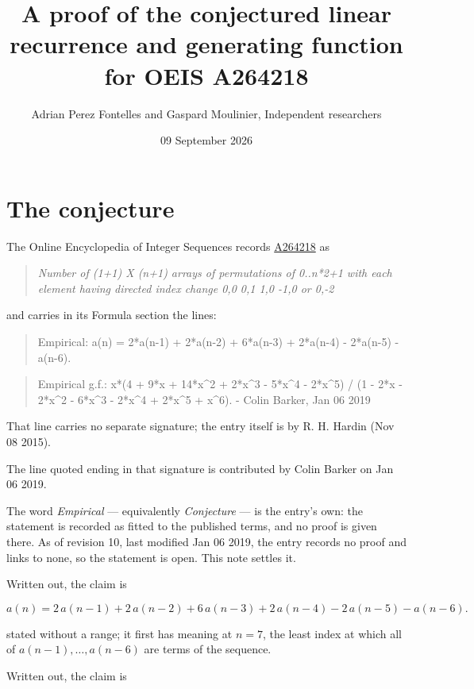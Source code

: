 \documentclass[11pt]{article}
\title{A proof of the conjectured linear recurrence and generating function for OEIS A264218}
\author{Adrian Perez Fontelles and Gaspard Moulinier, Independent researchers}
\date{09 September 2026}
\theoremstyle{definition}
\begin{document}
\maketitle
\section{The conjecture}

The Online Encyclopedia of Integer Sequences records \href{https://oeis.org/A264218}{A264218} as

\begin{quote}\itshape Number of (1+1) X (n+1) arrays of permutations of 0..n*2+1 with each element having directed index change 0,0 0,1 1,0 -1,0 or 0,-2\end{quote}

and carries in its Formula section the lines:

\begin{quote}\ttfamily Empirical: a(n) = 2*a(n-1) + 2*a(n-2) + 6*a(n-3) + 2*a(n-4) - 2*a(n-5) - a(n-6).\end{quote}

\begin{quote}\ttfamily Empirical g.f.: x*(4 + 9*x + 14*x\textasciicircum{}2 + 2*x\textasciicircum{}3 - 5*x\textasciicircum{}4 - 2*x\textasciicircum{}5) / (1 - 2*x - 2*x\textasciicircum{}2 - 6*x\textasciicircum{}3 - 2*x\textasciicircum{}4 + 2*x\textasciicircum{}5 + x\textasciicircum{}6). - Colin Barker, Jan 06 2019\end{quote}

That line carries no separate signature; the entry itself is by R. H. Hardin (Nov 08 2015).

The line quoted ending in that signature is contributed by Colin Barker on Jan 06 2019.

The word {\itshape Empirical} --- equivalently {\itshape Conjecture} --- is the entry's own: the statement is recorded as fitted to the published terms, and no proof is given there. As of revision 10, last modified Jan 06 2019, the entry records no proof and links to none, so the statement is open. This note settles it.

Written out, the claim is

\[a(n) = 2\,a(n-1) + 2\,a(n-2) + 6\,a(n-3) + 2\,a(n-4) - 2\,a(n-5) - a(n-6).\]

stated without a range; it first has meaning at $n = 7$, the least index at which all of $a(n-1),\dots,a(n-6)$ are terms of the sequence.

Written out, the claim is
\end{document}
